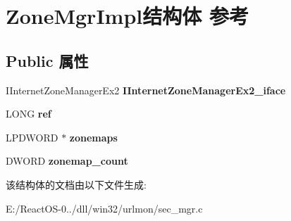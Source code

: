 \hypertarget{struct_zone_mgr_impl}{}\section{Zone\+Mgr\+Impl结构体 参考}
\label{struct_zone_mgr_impl}
\subsection*{Public 属性}
\begin{DoxyCompactItemize}
\item 
\mbox{\label{struct_zone_mgr_impl_acc7aa8df085addc1a2fbe5d04dc84a19}} 
I\+Internet\+Zone\+Manager\+Ex2 {\bfseries I\+Internet\+Zone\+Manager\+Ex2\+\_\+iface}
\item 
\mbox{\label{struct_zone_mgr_impl_a4ceb5eb717cfaf2e791b0c4bf4c4745e}} 
L\+O\+NG {\bfseries ref}
\item 
\mbox{\label{struct_zone_mgr_impl_af4cf13fc8ef1343c4b5135f9d64000fe}} 
L\+P\+D\+W\+O\+RD $\ast$ {\bfseries zonemaps}
\item 
\mbox{\label{struct_zone_mgr_impl_a99f6ef490f960665edfde3ab3a7bb2de}} 
D\+W\+O\+RD {\bfseries zonemap\+\_\+count}
\end{DoxyCompactItemize}


该结构体的文档由以下文件生成\+:\begin{DoxyCompactItemize}
\item 
E\+:/\+React\+O\+S-\/0../dll/win32/urlmon/sec\+\_\+mgr.\+c\end{DoxyCompactItemize}
